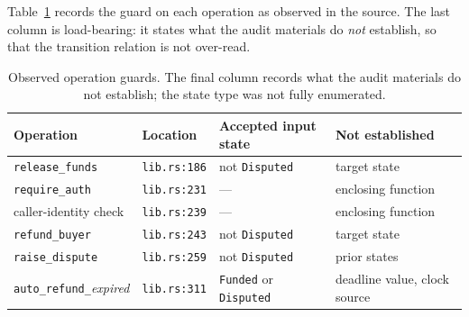 \documentclass[sigconf,review]{acmart}
\begin{document}
Table~\ref{tab:guards} records the guard on each operation as observed in the
source. The last column is load-bearing: it states what the audit materials do
\emph{not} establish, so that the transition relation is not over-read.

\begin{table}[t]
\caption{Observed operation guards. The final column records what the audit
materials do not establish; the state type was not fully enumerated.}
\label{tab:guards}
\small
\begin{tabular}{@{}llll@{}}
\toprule
Operation & Location & Accepted input state & Not established \\
\midrule
\texttt{release\_funds}    & \texttt{lib.rs:186} & not \texttt{Disputed} & target state \\
\texttt{require\_auth}     & \texttt{lib.rs:231} & --- & enclosing function \\
caller-identity check     & \texttt{lib.rs:239} & --- & enclosing function \\
\texttt{refund\_buyer}     & \texttt{lib.rs:243} & not \texttt{Disputed} & target state \\
\texttt{raise\_dispute}    & \texttt{lib.rs:259} & not \texttt{Disputed} & prior states \\
\texttt{auto\_refund\_}\newline\textit{expired} &
  \texttt{lib.rs:311} & \texttt{Funded} or \newline \texttt{Disputed} &
  deadline value, \newline clock source \\
\bottomrule
\end{tabular}
\end{table}



\end{document}
